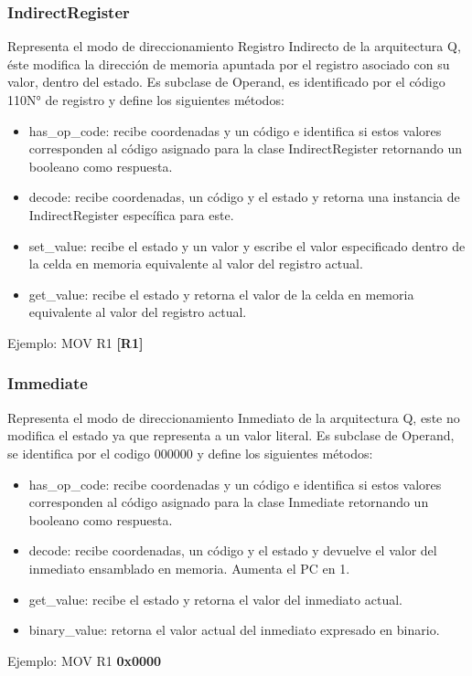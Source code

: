\subsubsection{IndirectRegister}
Representa el modo de direccionamiento Registro Indirecto de la arquitectura Q, éste modifica la dirección de memoria apuntada por el registro asociado con su valor, dentro del estado.
Es subclase de Operand, es identificado por el código 110{N° de registro} y define los siguientes métodos:
 
\begin{itemize}
    \item has\_op\_code: recibe coordenadas y un código e identifica si estos valores corresponden al código asignado para la clase IndirectRegister retornando un booleano como respuesta.
    \item decode: recibe coordenadas, un código y el estado y retorna una instancia de IndirectRegister específica para este.
    \item set\_value: recibe el estado y un valor y escribe el valor especificado dentro de la celda en memoria equivalente al valor del registro actual.
    \item get\_value: recibe el estado y retorna el valor de la celda en memoria equivalente al valor del registro actual.
\end{itemize}
Ejemplo: MOV R1 \textbf{[R1]}
 
\subsubsection{Immediate}
Representa el modo de direccionamiento Inmediato de la arquitectura Q, este no modifica el estado ya que representa a un valor literal.
Es subclase de Operand, se identifica por el codigo 000000 y define los siguientes métodos:
 
\begin{itemize}
    \item has\_op\_code: recibe coordenadas y un código e identifica si estos valores corresponden al código asignado para la clase Inmediate retornando un booleano como respuesta.
    \item decode: recibe coordenadas, un código y el estado y devuelve el valor del inmediato ensamblado en memoria. Aumenta el PC en 1.
    \item get\_value: recibe el estado y retorna el valor del inmediato actual.
    \item binary\_value: retorna el valor actual del inmediato expresado en binario.
\end{itemize}
Ejemplo: MOV R1 \textbf{0x0000}
 
